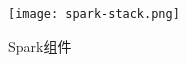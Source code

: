 \begin{figure}
  \centering
  \texttt{[image: spark-stack.png]}
  \caption{Spark组件}
  \label{fig:Spark组件}
\end{figure}








